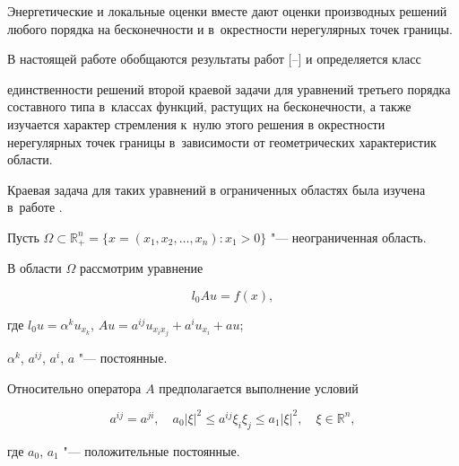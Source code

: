Энергетические и локальные оценки вместе дают оценки производных решений любого порядка на бесконечности и в~окрестности нерегулярных точек границы.





В настоящей работе обобщаются результаты работ [--] и определяется класс

единственности решений второй краевой задачи для уравнений третьего порядка составного типа в~классах функций, растущих на бесконечности, а также изучается характер стремления к~нулю этого решения в окрестности нерегулярных точек границы в~зависимости от геометрических характеристик области. 

Краевая задача для таких уравнений в ограниченных областях была изучена в~работе \cite {khashimovl:bib:Kojan}.



\smallskip




Пусть $\Omega\subset \mathbb R_+^n=\bigl\{x{=}(x_1, x_2, \dots, x_n): x_1>0 \bigr\}$ "--- неограниченная область. 

В области $\Omega$ рассмотрим уравнение 

\begin{equation}

 l_0Au=f(x),

 \label{eq:kha:e1}

\end{equation}

где $l_0u=\alpha^ku_{x_k}$, $Au=a^{ij}u_{x_ix_j}+a^iu_{x_i}+au$;

$\alpha^k$, $a^{ij}$, $a^{i}$, $a $ "--- постоянные.



Относительно оператора $A$ предполагается выполнение условий

\begin{equation}

a^{ij}=a^{ji}, \quad   

a_0|\xi|^2\leqslant a^{ij}\xi_i \xi_j\leqslant a_1|\xi|^2,\quad  \xi\in \mathbb R^n,

\label{eq:kha:e2}

\end{equation}

где $a_0$, $a_1$ "--- положительные постоянные.




